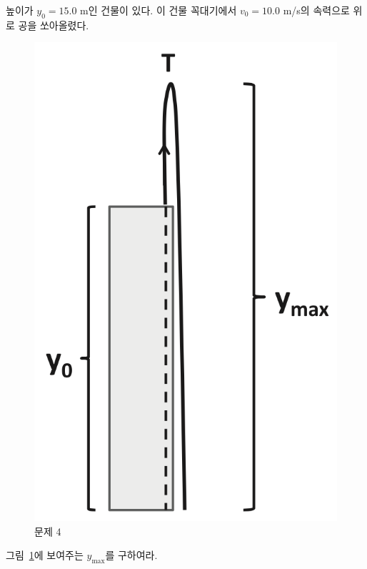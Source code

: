 \documentclass[floatfix,nofootinbib,superscriptaddress,fleqn,preprint]{revtex4-2}
\begin{document}
 높이가 $y_0=15.0$ m인 건물이 있다. 이 건물
꼭대기에서 $v_0=10.0$ m/s의 속력으로 위로 공을 쏘아올렸다. 
\begin{figure}[ht]
  \centering
\includegraphics[scale=0.5]{Qfig4-4-20210312.png}  
  \caption{문제 4}
  \label{fig:4}
\end{figure}
그림~\ref{fig:4}에 보여주는 $y_{\mathrm{max}}$를 구하여라. 
\vspace{0.2cm}
\end{document}
